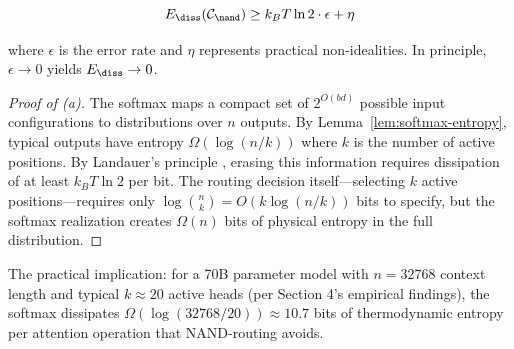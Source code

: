 \begin{theorem}
\begin{enumerate}
    \[






    E_{\diss}(\mathcal{C}_{\nand}) \geq k_B T \ln 2 \cdot \epsilon + \eta






    \]






    where $\epsilon$ is the error rate and $\eta$ represents practical non-idealities. In principle, $\epsilon \to 0$ yields $E_{\diss} \to 0$.






\end{enumerate}






\end{theorem}













\begin{proof}[Proof of (a)]






The softmax maps a compact set of $2^{O(bd)}$ possible input configurations to distributions over $n$ outputs. By Lemma~\ref{lem:softmax-entropy}, typical outputs have entropy $\Omega(\log(n/k))$ where $k$ is the number of active positions. By Landauer's principle \cite{landauer1961}, erasing this information requires dissipation of at least $k_B T \ln 2$ per bit. The routing decision itself—selecting $k$ active positions—requires only $\log \binom{n}{k} = O(k \log(n/k))$ bits to specify, but the softmax realization creates $\Omega(n)$ bits of physical entropy in the full distribution.






\end{proof}













The practical implication: for a 70B parameter model with $n = 32768$ context length and typical $k \approx 20$ active heads (per Section 4's empirical findings), the softmax dissipates $\Omega(\log(32768/20)) \approx 10.7$ bits of thermodynamic entropy per attention operation that NAND-routing avoids.













